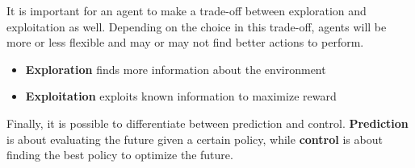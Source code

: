 It is important for an agent to make a trade-off between exploration and exploitation as well. Depending on the choice in this trade-off, agents will be more or less flexible and may or may not find better actions to perform.
\begin{itemize}
	\item \textbf{Exploration} finds more information about the environment
	\item \textbf{Exploitation} exploits known information to maximize reward
\end{itemize}

Finally, it is possible to differentiate between prediction and control. \textbf{Prediction} is about evaluating the future given a certain policy, while \textbf{control} is about finding the best policy to optimize the future.